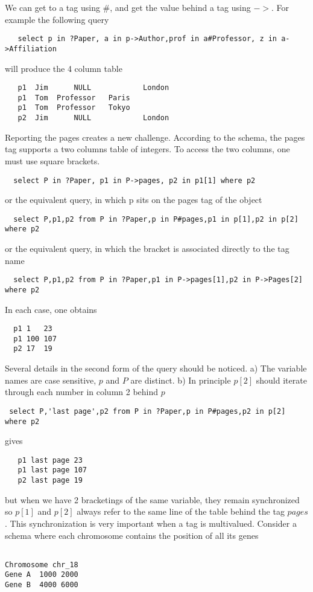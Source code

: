 \documentclass[11pt]{article}
\newcommand{\BL}{\begin{lstlisting}}
\begin{document}
We can get to a tag using $\#$, and get the value behind a tag using $-$$>$. For example the following query
\BL
   select p in ?Paper, a in p->Author,prof in a#Professor, z in a->Affiliation
\end{lstlisting}
will produce the 4 column table
\BL
   p1  Jim      NULL            London
   p1  Tom	Professor	Paris
   p1  Tom	Professor	Tokyo
   p2  Jim      NULL            London
\end{lstlisting}

Reporting the pages creates a new challenge. According to the schema, the pages tag supports a two columns table of integers.
 To access the two columns, one must use square brackets.
\BL
  select P in ?Paper, p1 in P->pages, p2 in p1[1] where p2
\end{lstlisting}
or the equivalent query, in which p sits on the pages tag of the object
\BL
  select P,p1,p2 from P in ?Paper,p in P#pages,p1 in p[1],p2 in p[2] where p2
\end{lstlisting}
or the equivalent query, in which the bracket is associated directly to the tag name
\BL
  select P,p1,p2 from P in ?Paper,p1 in P->pages[1],p2 in P->Pages[2] where p2
\end{lstlisting}

In each case, one obtains
\BL
  p1 1   23
  p1 100 107
  p2 17  19
\end{lstlisting}

Several details in the second form of the query should be noticed.
  a) The variable names are case sensitive, $p$ and $P$ are distinct. 
  b) In principle $p[2]$ should iterate through each number in column 2 behind $p$
\BL
 select P,'last page',p2 from P in ?Paper,p in P#pages,p2 in p[2] where p2
\end{lstlisting}
gives
\BL
   p1 last page 23
   p1 last page 107
   p2 last page 19
\end{lstlisting}
but when we have 2 bracketings of the same variable, they remain synchronized so $p[1]$ 
and $p[2]$ always refer to the same line of the table behind the tag $pages$.
This synchronization is very important when a tag is multivalued. Consider a schema
where each chromosome contains the position of all its genes
\BL

Chromosome chr_18
Gene A  1000 2000
Gene B  4000 6000
\end{lstlisting}
\end{document}
